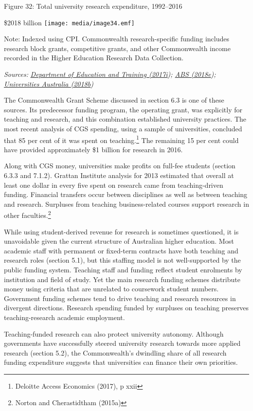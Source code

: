 \documentclass[]{book}
\begin{document}
\protect\hypertarget{_Ref453257516}{}{}Figure 32: Total university research expenditure, 1992--2016

\$2018 billion \texttt{[image: media/image34.emf]}

Note: Indexed using CPI. Commonwealth research-specific funding includes research block grants, competitive grants, and other Commonwealth income recorded in the Higher Education Research Data Collection.

\emph{Sources:} \emph{\protect\hyperlink{_ENREF_75}{Department of Education and Training (2017i}); \protect\hyperlink{_ENREF_12}{ABS (2018e}); \protect\hyperlink{_ENREF_209}{Universities Australia (2018b})}

The Commonwealth Grant Scheme discussed in section 6.3 is one of these sources. Its predecessor funding program, the operating grant, was explicitly for teaching and research, and this combination established university practices. The most recent analysis of CGS spending, using a sample of universities, concluded that 85 per cent of it was spent on teaching.\footnote{Deloitte Access Economics (2017), p xxii} The remaining 15 per cent could have provided approximately \$1 billion for research in 2016.

Along with CGS money, universities make profits on full-fee students (section 6.3.3 and 7.1.2). Grattan Institute analysis for 2013 estimated that overall at least one dollar in every five spent on research came from teaching-driven funding. Financial transfers occur between disciplines as well as between teaching and research. Surpluses from teaching business-related courses support research in other faculties.\footnote{Norton and Cherastidtham (2015a)}

While using student-derived revenue for research is sometimes questioned, it is unavoidable given the current structure of Australian higher education. Most academic staff with permanent or fixed-term contracts have both teaching and research roles (section 5.1), but this staffing model is not well-supported by the public funding system. Teaching staff and funding reflect student enrolments by institution and field of study. Yet the main research funding schemes distribute money using criteria that are unrelated to coursework student numbers. Government funding schemes tend to drive teaching and research resources in divergent directions. Research spending funded by surpluses on teaching preserves teaching-research academic employment.

Teaching-funded research can also protect university autonomy. Although governments have successfully steered university research towards more applied research (section 5.2), the Commonwealth's dwindling share of all research funding expenditure suggests that universities can finance their own priorities.
\end{document}
